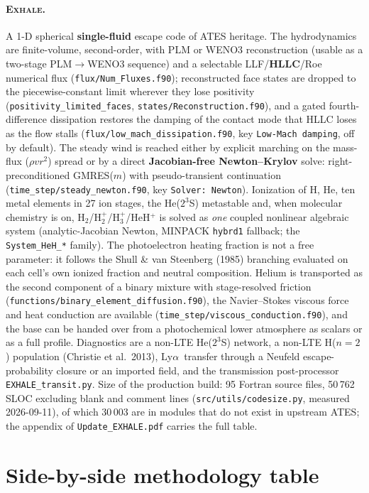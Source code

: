 \documentclass[english,a4paper]{my_memo}
\newcommand{\EXHALE}{\textsc{Exhale}}
\newcommand{\Lya}{Ly$\alpha$}
\begin{document}
\paragraph{\EXHALE.} A 1-D spherical \textbf{single-fluid} escape code of ATES
heritage. The hydrodynamics are finite-volume, second-order, with PLM or WENO3
reconstruction (usable as a two-stage PLM$\rightarrow$WENO3 sequence) and a
selectable LLF/\textbf{HLLC}/Roe numerical flux
(\texttt{flux/Num\_Fluxes.f90}); reconstructed face states are dropped to the
piecewise-constant limit wherever they lose positivity
(\texttt{positivity\_limited\_faces}, \texttt{states/Reconstruction.f90}), and
a gated fourth-difference dissipation restores the damping of the contact mode
that HLLC loses as the flow stalls (\texttt{flux/low\_mach\_dissipation.f90},
key \texttt{Low-Mach damping}, off by default). The steady wind is reached either by explicit marching on the mass-flux
($\rho v r^2$) spread or by a direct \textbf{Jacobian-free Newton--Krylov}
solve: right-preconditioned GMRES($m$) with pseudo-transient continuation
(\texttt{time\_step/steady\_newton.f90}, key \texttt{Solver: Newton}).
Ionization of H, He, ten metal elements in 27 ion stages, the He($2^3$S)
metastable and, when molecular chemistry is on, H$_2$/H$_2^+$/H$_3^+$/HeH$^+$
is solved as \emph{one} coupled nonlinear algebraic system (analytic-Jacobian
Newton, MINPACK \texttt{hybrd1} fallback; the \texttt{System\_HeH\_*} family).
The photoelectron heating fraction is not a free parameter: it follows the
Shull \& van Steenberg (1985) branching evaluated on each cell's own ionized
fraction and neutral composition. Helium is transported as the second
component of a binary mixture with stage-resolved friction
(\texttt{functions/binary\_element\_diffusion.f90}), the Navier--Stokes viscous
force and heat conduction are available
(\texttt{time\_step/viscous\_conduction.f90}), and the base can be handed over
from a photochemical lower atmosphere as scalars or as a full profile.
Diagnostics are a non-LTE He($2^3$S) network, a non-LTE H($n{=}2$) population
(Christie et al.\ 2013), \Lya\ transfer through a Neufeld escape-probability
closure or an imported field, and the transmission post-processor
\texttt{EXHALE\_transit.py}. Size of the production build: 95 Fortran source
files, 50\,762 SLOC excluding blank and comment lines
(\texttt{src/utils/codesize.py}, measured 2026-09-11), of which 30\,003 are
in modules that
do not exist in upstream ATES; the appendix of \texttt{Update\_EXHALE.pdf}
carries the full table.

\section{Side-by-side methodology table}
\label{sec:table}
\end{document}
